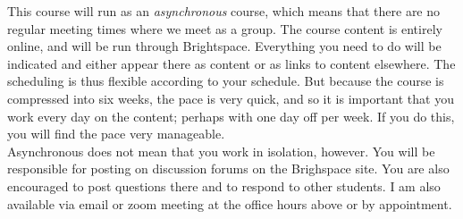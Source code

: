 This course will run as an {\it asynchronous} course, which means that there are no regular meeting times where we meet as a group. The course content is entirely online, and will be run through Brightspace. Everything you need to do will be indicated and either appear there as content or as links to content elsewhere. The scheduling is thus flexible according to your schedule. But because the course is compressed into six weeks, the pace is very quick, and so it is important that you work every day on the content; perhaps with one day off per week. If you do this, you will find the pace very manageable.\\

Asynchronous does not mean that you work in isolation, however. You will be responsible for posting on discussion forums on the Brighspace site. You are also encouraged to post questions there and to respond to other students. I am also available via email or zoom meeting at the office hours above or by appointment. 